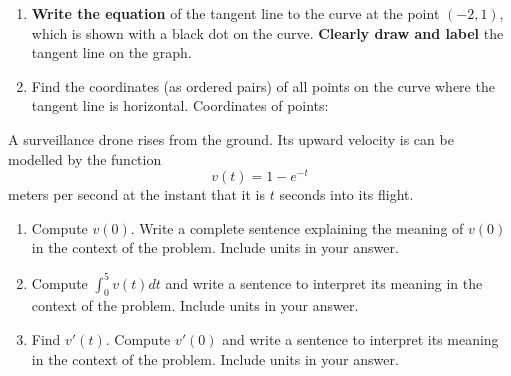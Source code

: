 \documentclass[12pt]{article}
\renewcommand{\emph}[1]{\textsf{\textbf{#1}}}
\newcounter{probcount}
\newcounter{subprobcount}
\def\problem#1{\setcounter{subprobcount}{0}%
\addtocounter{probcount}{1}{\emph{\arabic{probcount}.\hskip 1em(#1)}}\par}
\newenvironment{subproblems}{%
\begin{enumerate}%
\setcounter{enumi}{\value{subprobcount}}%
\renewcommand{\theenumi}{\emph{\alph{enumi}}}}%
{\setcounter{subprobcount}{\value{enumi}}\end{enumerate}}
\begin{document}
\begin{subproblems}
\item \emph{Write the equation} of the tangent line to the curve at the point $(-2,1)$, which is shown with a black dot on the curve. \emph{Clearly draw and label} the tangent line on the graph. %
\vspace{2 cm}

\item Find the coordinates (as ordered pairs) of all points on the curve where the tangent line is horizontal.
\vfill
Coordinates of points: \hrulefill
\end{subproblems}
\newpage

\problem{12 points} A surveillance drone rises from the ground. Its upward velocity is can be modelled by the function \[v(t)=1-e^{-t}\] meters per second at the instant that it is $t$ seconds into its flight.
\begin{subproblems}
\item Compute $v(0)$. Write a complete sentence explaining the meaning of $v(0)$ in the context of the problem. Include units in your answer.
\vfill
\item Compute $\displaystyle \int_0^5 v(t)dt$ and write a sentence to interpret its meaning in the context of the problem. Include units in your answer.
\vfill
\item Find $v'(t)$. Compute $v'(0)$ and write a sentence to interpret its meaning in the context of the problem. Include units in your answer.
\vfill
\end{subproblems}
\end{document}

